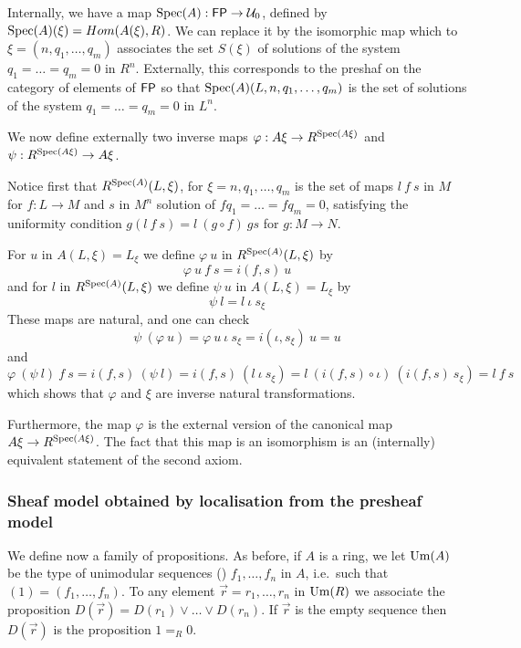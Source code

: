 Internally, we have a map $\operatorname{Spec}(A):\mathsf{FP}\rightarrow \mathcal{U}_0$, defined by $\operatorname{Spec}(A)(\xi) = Hom(A(\xi),R)$.
We can replace it by the isomorphic map which to $\xi = (n,q_1,\dots,q_m)$ associates the set
$S(\xi)$ of solutions of the system $q_1=\dots=q_m= 0$ in $R^n$.
Externally, this corresponds to the preshaf on the category of elements of $\mathsf{FP}$ so that
$\operatorname{Spec}(A)(L,n,q_1,\dots,q_m)$ is the set of solutions of the system $q_1=\dots=q_m=0$ in $L^n$.

\medskip

We now define externally two inverse maps $\varphi:A\xi\rightarrow R^{\operatorname{Spec}(A\xi)}$ and
$\psi:R^{\operatorname{Spec}(A\xi)}\rightarrow A\xi$.

\medskip

Notice first that $R^{\operatorname{Spec}(A)}(L,\xi)$, for $\xi = n,q_1,\dots,q_m$
is the set of maps $l~f~s$ in $M$ for $f:L\rightarrow M$
and $s$ in $M^n$ solution of $fq_1 = \dots = fq_m=0$, satisfying the uniformity condition
$g(l~f~s) = l~(g\circ f)~gs$ for $g:M\rightarrow N$.

\medskip

For $u$ in $A(L,\xi) = L_{\xi}$ we define $\varphi~u$ in $R^{\operatorname{Spec}(A)}(L,\xi)$ by
$$
\varphi~u~f~s = i(f,s)~u
$$
and for $l$ in $R^{\operatorname{Spec}(A)}(L,\xi)$ we define $\psi~u$ in $A(L,\xi) = L_{\xi}$ by
$$
\psi~ l = l~\iota~s_{\xi}
$$
These maps are natural, and one can check
$$
\psi~(\varphi~u) = \varphi~u~\iota~s_{\xi} = i(\iota,s_{\xi})~u = u
$$
and
$$
\varphi~(\psi~l)~f~s = i(f,s)~(\psi~l) = i(f,s)~(l~\iota~s_{\xi}) = l~(i(f,s)\circ \iota)~(i(f,s)~s_{\xi}) = l~f~s
$$
which shows that $\varphi$ and $\xi$ are inverse natural transformations.

Furthermore, the map $\varphi$ is the external version of the canonical map $A\xi\rightarrow R^{\operatorname{Spec}(A\xi)}$.
The fact that this map is an isomorphism is an (internally) equivalent statement of the second axiom.



\subsubsection{Sheaf model obtained by localisation from the presheaf model}

We define now a family of propositions. As before, if $A$ is a ring, we let $\mathrm{Um}(A)$ be the type of unimodular sequences
()
$f_1,\dots,f_n$ in $A$, i.e.\ such that $(1) = (f_1,\dots,f_n)$. To any element $\vec{r} = r_1,\dots,r_n$
in $\mathrm{Um}(R)$ we associate
the proposition $D(\vec{r}) = D(r_1)\vee\dots\vee D(r_n)$. If $\vec{r}$ is the empty sequence then
$D(\vec{r})$ is the proposition $1 =_R 0$. %

